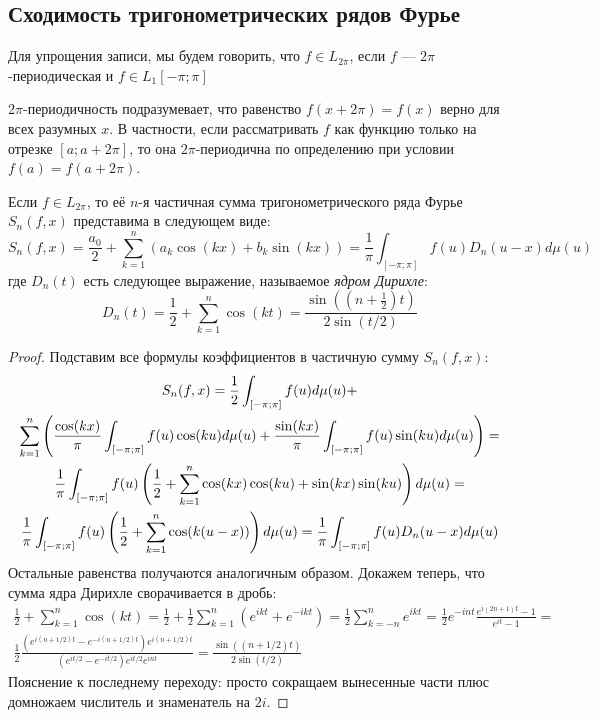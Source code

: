 \subsection{Сходимость тригонометрических рядов Фурье}

\begin{note}
	Для упрощения записи, мы будем говорить, что $f \in L_{2\pi}$, если $f$ --- $2\pi$-периодическая и $f \in L_1[-\pi; \pi]$
\end{note}

\begin{anote}
	$2\pi$-периодичность подразумевает, что равенство $f(x + 2\pi) = f(x)$ верно для всех разумных $x$. В частности, если рассматривать $f$ как функцию только на отрезке $[a; a + 2\pi]$, то она $2\pi$-периодична по определению при условии $f(a) = f(a + 2\pi)$.
\end{anote}

\begin{lemma}
	Если $f \in L_{2\pi}$, то её $n$-я частичная сумма тригонометрического ряда Фурье $S_n(f, x)$ представима в следующем виде:
	\[
		S_n(f, x) = \frac{a_0}{2} + \sum_{k = 1}^n (a_k\cos(kx) + b_k\sin(kx)) = \frac{1}{\pi}\int_{[-\pi; \pi]} f(u)D_n(u - x)d\mu(u)
	\]
	где $D_n(t)$ есть следующее выражение, называемое \textit{ядром Дирихле}:
	\[
		D_n(t) = \frac{1}{2} + \sum_{k = 1}^n \cos(kt) = \frac{\sin((n + \frac{1}{2})t)}{2\sin(t / 2)}
	\]
\end{lemma}

\begin{proof}
	Подставим все формулы коэффициентов в частичную сумму $S_n(f, x)$:
	\begin{multline*}
		S_n(f, x) = \frac{1}{2}\int_{[-\pi; \pi]} f(u)d\mu(u) +
		\\
		\sum_{k = 1}^n \left(\frac{\cos(kx)}{\pi}\int_{[-\pi; \pi]} f(u)\cos(ku)d\mu(u) + \frac{\sin(kx)}{\pi}\int_{[-\pi; \pi]} f(u)\sin(ku)d\mu(u)\right) =
		\\
		\frac{1}{\pi} \int_{[-\pi; \pi]} f(u)\left(\frac{1}{2} + \sum_{k = 1}^n \cos(kx)\cos(ku) + \sin(kx)\sin(ku)\right)d\mu(u) =
		\\
		\frac{1}{\pi} \int_{[-\pi; \pi]} f(u)\left(\frac{1}{2} + \sum_{k = 1}^n \cos(k(u - x))\right)d\mu(u) = \frac{1}{\pi} \int_{[-\pi; \pi]} f(u)D_n(u - x)d\mu(u)
	\end{multline*}
	Остальные равенства получаются аналогичным образом. Докажем теперь, что сумма ядра Дирихле сворачивается в дробь:
	\begin{multline*}
		\frac{1}{2} + \sum_{k = 1}^n \cos(kt) = \frac{1}{2} + \frac{1}{2}\sum_{k = 1}^n (e^{ikt} + e^{-ikt}) = \frac{1}{2} \sum_{k = -n}^n e^{ikt} = \frac{1}{2} e^{-int} \frac{e^{i(2n + 1)t} - 1}{e^{it} - 1} =
		\\
		\frac{1}{2}\frac{(e^{i(n + 1/2)t} - e^{-i(n + 1/2)t})e^{i(n + 1/2)t}}{(e^{it/2} - e^{-it/2})e^{it/2}e^{int}} = \frac{\sin((n + 1/2)t)}{2\sin(t/2)}
	\end{multline*}
	Пояснение к последнему переходу: просто сокращаем вынесенные части плюс домножаем числитель и знаменатель на $2i$.
\end{proof}

